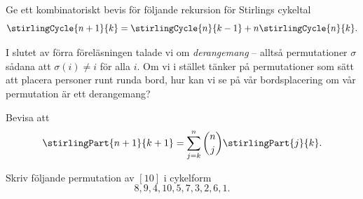 \documentclass[nobib]{tufte-handout}
\begin{document}
\begin{xca}
  Ge ett kombinatoriskt bevis för följande rekursion för Stirlings cykeltal
  $$\stirlingCycle{n+1}{k} = \stirlingCycle{n}{k-1} + n\stirlingCycle{n}{k}.$$
\end{xca}

\begin{xca}
  I slutet av förra föreläsningen talade vi om \emph{derangemang} -- alltså permutationer $\sigma$ sådana att $\sigma(i) \neq i$ för alla $i$. Om vi i stället tänker på permutationer som sätt att placera personer runt runda bord, hur kan vi se på vår bordsplacering om vår permutation är ett derangemang?
\end{xca}

\begin{xca}
  Bevisa att
  $$\stirlingPart{n+1}{k+1} = \sum_{j=k}^{n} \binom{n}{j}\stirlingPart{j}{k}.$$
\end{xca}

\begin{xca}
  Skriv följande permutation av $[10]$ i cykelform
  $$8, 9, 4, 10, 5, 7, 3, 2, 6, 1.$$
\end{xca}

%
%
\end{document}
